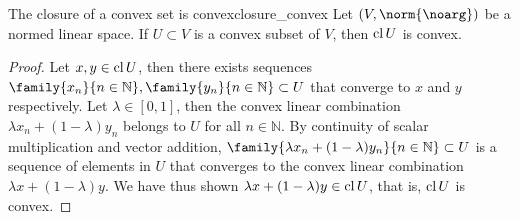 \begin{proposition}{The closure of a convex set is convex}{closure_convex}
    Let \((V, \norm{\noarg})\) be a normed linear space. If \(U \subset V\) is a convex subset of \(V\), then \(\operatorname{cl}{U}\) is convex.
\end{proposition}
\begin{proof}
    Let \(x, y \in \operatorname{cl}{U}\), then there exists sequences \(\family{x_n}{n\in \mathbb{N}}, \family{y_n}{n\in \mathbb{N}} \subset U\) that converge to \(x\) and \(y\) respectively. Let \(\lambda \in [0,1]\), then the convex linear combination \(\lambda x_n + (1-\lambda)y_n\) belongs to \(U\) for all \(n \in \mathbb{N}\). By continuity of scalar multiplication and vector addition, \(\family{\lambda x_n + (1- \lambda)y_n}{n\in \mathbb{N}}\subset U\) is a sequence of elements in \(U\) that converges to the convex linear combination \(\lambda x + (1 - \lambda)y\). We have thus shown \(\lambda x + (1 - \lambda)y \in \operatorname{cl}{U}\), that is, \(\operatorname{cl}{U}\) is convex.
\end{proof}

